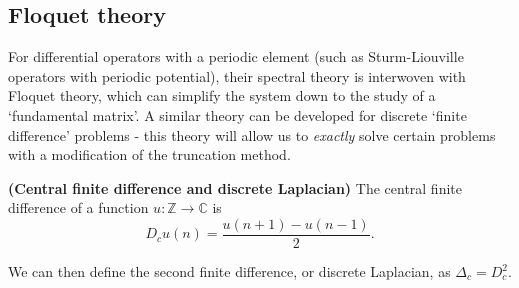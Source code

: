\documentclass[../main.tex]{subfiles}
\begin{document}
\subsection{Floquet theory}
For differential operators with a periodic element
(such as Sturm-Liouville operators with periodic potential), their spectral
theory is interwoven with Floquet theory, which can simplify the system down to
the study of a `fundamental matrix'. A similar theory can be developed for
discrete `finite difference' problems - this theory will allow us to
\emph{exactly} solve certain problems with a modification of the truncation
method.

\begin{definition}{\textbf{(Central finite difference and discrete Laplacian)}}
  The central finite difference of a function $u: \mathbb{Z} \rightarrow
  \mathbb{C}$ is $$D_c u (n) = \frac{u(n+1) - u(n-1)}{2}.$$

  We can then define the second finite difference, or discrete Laplacian, as
  $\Delta_c = D_c^2$.
\end{definition}
\end{document}
